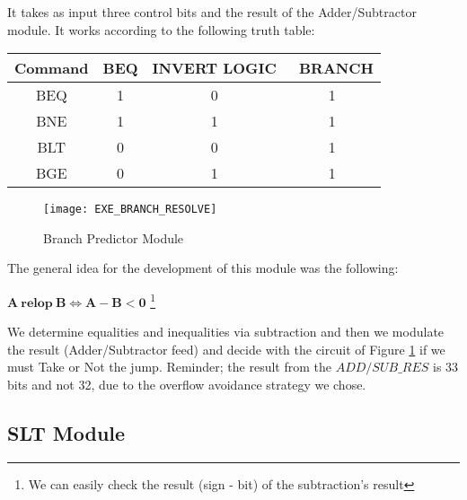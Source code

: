   	It takes as input three control bits and the result of the Adder/Subtractor module. It works according to the following truth table:
  	
  	\begin{center}
  		
  		\begin{tabular}{|c|c|c|c|} \hline
  		\setrow{\bfseries}Command &\setrow{\bfseries} BEQ &\setrow{\bfseries} INVERT LOGIC &\ \setrow{\bfseries}BRANCH \\\hline
  		BEQ     & 1 & 0 & 1 \\\hline
  		BNE     & 1 & 1 & 1 \\\hline
  		BLT     & 0 & 0 & 1 \\\hline
  		BGE     & 0 & 1 & 1 \\\hline
	  	\end{tabular}
  
  		\label{Table 3.7}
	
  	\end{center}
  	  	
  	\begin{figure}[h!]
  		\begin{center}
  			\texttt{[image: EXE\_BRANCH\_RESOLVE]}
  			\caption{Branch Predictor Module}
  			\label{Image3.10}
  		\end{center}
  	\end{figure}
  	
  	\vspace{-4mm}
  	
    The general idea for the development of this module was the following:
    \begin{center}
    	$\mathbf{ A \ relop \ B \Longleftrightarrow A - B < 0}$ \footnote{We can easily check the result (sign - bit) of the subtraction's result}
    \end{center}
    We determine equalities and inequalities via subtraction and then we modulate the result (Adder/Subtractor feed) and decide with the circuit of Figure \ref{Image3.10} if we must Take or Not the jump. Reminder; the result from the $ADD/SUB\_RES$ is 33 bits and not 32, due to the overflow avoidance strategy we chose.
  	\vspace{-1mm}
	\subsection{\textcolor{ao}{SLT Module}}
	\label{SubSec3.3.5:SLT}

